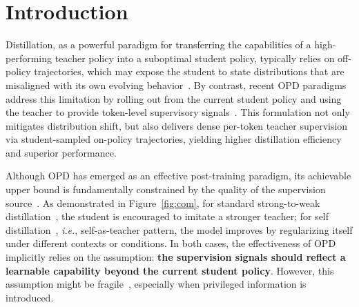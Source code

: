 \documentclass{llmxive}
\begin{document}
\section{Introduction}
Distillation, as a powerful paradigm for transferring the capabilities of a high-performing teacher policy into a  suboptimal student policy, typically relies on off-policy trajectories, which may expose the student to state distributions that are misaligned with its own evolving behavior~\citep{jin2026entropy,sanh2019distilbert,hsieh2023distilling,yu2026vismem,yao2026joyai}. By contrast, recent OPD paradigms address this limitation by rolling out from the current student policy and using the teacher to provide token-level supervisory signals~\citep{thinking2025opd,song2026survey,xiao2026mimo,xu2026deepseek}. This formulation not only mitigates distribution shift, but also delivers dense per-token teacher supervision via student-sampled on-policy trajectories, yielding higher distillation efficiency and superior performance.




Although OPD has emerged as an effective post-training paradigm, its achievable upper bound is fundamentally constrained by the quality of the supervision source~\citep{li2026rethinking,fu2026revisiting,ko2026scaling}. As demonstrated in Figure~\ref{fig:com}, for standard strong-to-weak distillation~\citep{ko2025distillm,thinking2025opd,jang2026stable,zhang2026fast,ye2026policy,yang2026learning,hou2026uni,wu2026lightning}, the student is encouraged to imitate a stronger teacher; for self distillation~\citep{shenfeld2026self,hubotter2026reinforcement,zhao2026self,penaloza2026privileged,stein2026gates}, \textit{i.e.}, self-as-teacher pattern, the model improves by regularizing itself under different contexts or conditions. 
In both cases, the effectiveness of OPD implicitly relies on the assumption: \textbf{the supervision signals should reflect a learnable capability beyond the current student policy}. 
However, this assumption might be fragile~\citep{li2026rethinking,song2026survey,yang2026self}, especially when privileged information is introduced.
\end{document}
